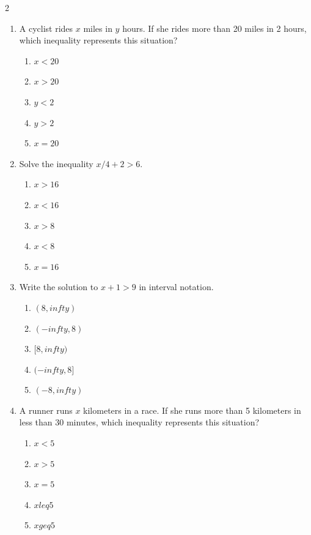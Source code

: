 \documentclass[10pt]{article}
\begin{document}
\begin{multicols}{2}
\begin{enumerate}[label=\textbf{Q\arabic*.}, leftmargin=*, itemsep=6pt, parsep=0pt]
  \item \small A cyclist rides $x$ miles in $y$ hours. If she rides more than 20 miles in 2 hours, which inequality represents this situation?
  \begin{enumerate}[label=(\Alph*), leftmargin=0.6cm, nosep, itemsep=2pt]
    \item $x < 20$
    \item $x > 20$
    \item $y < 2$
    \item $y > 2$
    \item $x = 20$
  \end{enumerate}

  \item \small Solve the inequality $x/4 + 2 > 6$.
  \begin{enumerate}[label=(\Alph*), leftmargin=0.6cm, nosep, itemsep=2pt]
    \item $x > 16$
    \item $x < 16$
    \item $x > 8$
    \item $x < 8$
    \item $x = 16$
  \end{enumerate}

  \item \small Write the solution to $x + 1 > 9$ in interval notation.
  \begin{enumerate}[label=(\Alph*), leftmargin=0.6cm, nosep, itemsep=2pt]
    \item $(8, infty)$
    \item $(-infty, 8)$
    \item $[8, infty)$
    \item $(-infty, 8]$
    \item $(-8, infty)$
  \end{enumerate}

  \item \small A runner runs $x$ kilometers in a race. If she runs more than 5 kilometers in less than 30 minutes, which inequality represents this situation?
  \begin{enumerate}[label=(\Alph*), leftmargin=0.6cm, nosep, itemsep=2pt]
    \item $x < 5$
    \item $x > 5$
    \item $x = 5$
    \item $x leq 5$
    \item $x geq 5$
  \end{enumerate}


\end{enumerate}
\end{multicols}
\end{document}
